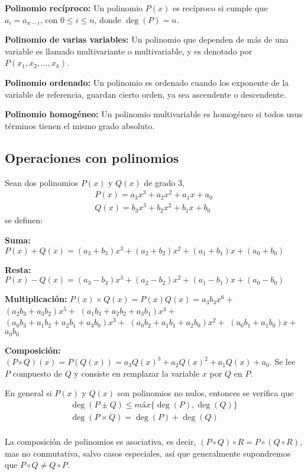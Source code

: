 \textbf{Polinomio recíproco:} Un polinomio $P(x)$ es recíproco si cumple que $a_i = a_{n-i}$, con $0\leq i\leq n$, donde $\deg{(P)} = n$.

\textbf{Polinomio de varias variables:} Un polinomio que dependen de más de una variable es llamado multivariante o multivariable, y es denotado por $P(x_1, x_2, \dots, x_k)$.

\textbf{Polinomio ordenado:} Un polinomio es ordenado cuando los exponente de la variable de referencia, guardan cierto orden, ya sea ascendente o descendente.

\textbf{Polinomio homogéneo:} Un polinomio multivariable es homogéneo si todos usus términos tienen el mismo grado absoluto.


\subsection{Operaciones con polinomios}

Sean dos polinomios $P(x)$ y $Q(x)$ de grado 3,
\begin{gather*}
    P(x) = a_3 x^3 + a_2 x^2 + a_1 x + a_0\\
    Q(x) = b_3 x^3 + b_2 x^2 + b_1 x + b_0
\end{gather*}
se definen:

\textbf{Suma:} $P(x) + Q(x) = (a_3+b_3)x^3+(a_2+b_2)x^2+(a_1+b_1)x+(a_0+b_0)$

\textbf{Resta:} $P(x) - Q(x) = (a_3-b_3)x^3+(a_2-b_2)x^2+(a_1-b_1)x+(a_0-b_0)$

\textbf{Multiplicación:} $P(x)\times Q(x) = P(x)Q(x) = a_3 b_3 x^6 + $
$(a_2 b_3 + a_3 b_2)x^5 + $
$(a_1 b_3 + a_2 b_2 + a_3 b_1)x^4 + $\\
$(a_0 b_3 + a_1 b_2 + a_2 b_1 + a_3 b_0)x^3 + $
$(a_0 b_2 + a_1 b_1 + a_2 b_0)x^2 + $
$(a_0 b_1 + a_1 b_0)x + $
$a_0 b_0$

\textbf{Composición:} $(P \circ Q)(x) = P(Q(x)) = a_3 Q(x)^3 + a_2 Q(x)^2 + a_1 Q(x) + a_0$. Se lee $P$ compuesto de $Q$ y consiste en remplazar la variable $x$ por $Q$ en $P$.

En general si $P(x)$ y $Q(x)$ son polinomios no nulos, entonces se verifica que
\begin{gather*}
    \deg{(P\pm Q)} \leq máx\{\deg{(P)}, \deg{(Q)}\}\\
    \deg{(P\times Q)} = \deg{(P)} + \deg{(Q)}\\
\end{gather*}

La composición de polinomios es asociativa, es decir, $(P \circ Q) \circ R = P \circ (Q \circ R)$, mas no conmutativa, salvo casos especiales, así que generalmente supondremos que $P \circ Q \neq  Q \circ P$.

